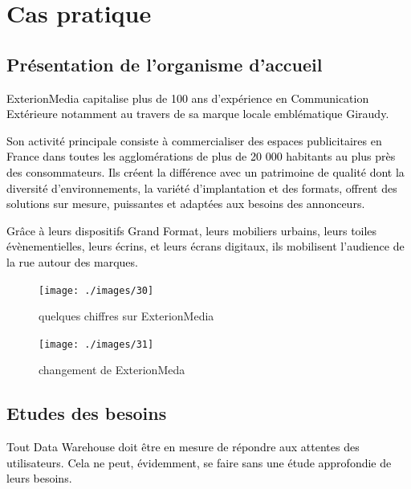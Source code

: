 \documentclass[a4paper,12pt]{report}
\begin{document}
\newpage 


\chapter{Cas pratique}
\section{Présentation de l’organisme d’accueil }
\textcolor{black}{ExterionMedia capitalise plus de 100 ans d’expérience en Communication Extérieure notamment au travers de sa marque locale emblématique Giraudy. }

\textcolor{black}{Son activité principale consiste à commercialiser des espaces publicitaires en France dans toutes les agglomérations de plus de 20 000 habitants au plus près des consommateurs. Ils créent la différence avec un patrimoine de qualité dont la diversité d’environnements, la variété d’implantation et des formats, offrent des solutions sur mesure, puissantes et adaptées aux besoins des annonceurs.}

\textcolor{black}{Grâce à leurs dispositifs Grand Format, leurs mobiliers urbains, leurs toiles évènementielles, leurs écrins, et leurs écrans digitaux, ils mobilisent l’audience de la rue autour des marques.}


\begin{figure}[H]

\begin{center}
\texttt{[image: ./images/30]}
\end{center}

\caption{quelques chiffres sur ExterionMedia}
\label{fig:1}

\end{figure}

\begin{figure}[H]

\begin{center}
\texttt{[image: ./images/31]}
\end{center}

\caption{changement de ExterionMeda}
\label{fig:1}

\end{figure}


\section{Etudes des besoins }
\textcolor{black}{Tout Data Warehouse doit être en mesure de répondre aux attentes des utilisateurs.
Cela ne peut, évidemment, se faire sans une étude approfondie de leurs besoins. }
\end{document}
